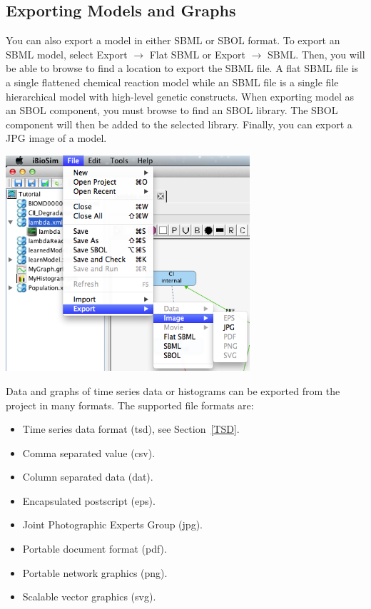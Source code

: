 \documentclass[titlepage,11pt]{article}
\begin{document}
\subsection{Exporting Models and Graphs}

\noindent
You can also export a model in either SBML or SBOL format.  To export an SBML model, select  Export $\rightarrow$ Flat SBML or Export $\rightarrow$ SBML.  Then, you will be able to browse to find a location to export the SBML file.  A flat SBML file is a single flattened chemical reaction model while an SBML file is a single file hierarchical model with high-level genetic constructs.  
When exporting model as an SBOL component, you must browse to find an SBOL library.  The SBOL component will then be added to the selected library.  Finally, you can export a JPG image of a model.

\begin{center}
\includegraphics[height=80mm]{screenshots/export}
\end{center} 

Data and graphs of time series data or histograms can be exported from the project in many formats.  The supported file formats are:  
\begin{itemize}
\item Time series data format (tsd), see Section~\ref{TSD}.
\item Comma separated value (csv).
\item Column separated data (dat).
\item Encapsulated postscript (eps). 
\item Joint Photographic Experts Group (jpg). 
\item Portable document format (pdf).
\item Portable network graphics (png). 
\item Scalable vector graphics (svg).
\end{itemize}
\end{document}
